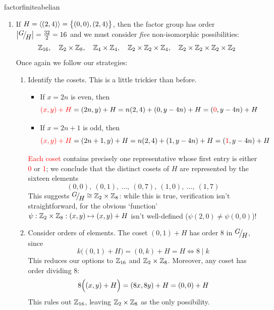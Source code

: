 \begin{examples}{}{factorfiniteabelian}
\begin{enumerate}
		\item\label{ex:factoriso3} If $H=\left\langle (2,4)\right\rangle=\bigl\{(0,0),(2,4)\bigr\}$, then the factor group has order $\nm{\quotient GH}=\frac{32}2=16$ and we must consider \emph{five} non-isomorphic possibilities:\footnotemark{}
		\[
			\mathbb{Z}_{16},\quad \mathbb{Z}_2\times\mathbb{Z}_8,\quad \mathbb{Z}_4\times\mathbb{Z}_4,\quad \mathbb{Z}_2\times\mathbb{Z}_2\times\mathbb{Z}_4,\quad \mathbb{Z}_2\times\mathbb{Z}_2\times\mathbb{Z}_2\times\mathbb{Z}_2
		\]
		Once again we follow our strategies:
		\begin{enumerate}
		  \item Identify the cosets. This is a little trickier than before.
		  \begin{itemize}
	  		\item If $x=2n$ is even, then
	  		\[
	  			\textcolor{red}{(x,y)+H}
	  			=(2n,y)+H
	  			=n(2,4)+(0,y-4n)+H
	  			=(\textcolor{red}{0},y-4n)+H
	  		\]
	  		\item If $x=2n+1$ is odd, then
	  		\[
	  			\textcolor{red}{(x,y)+H}
	  			=(2n+1,y)+H
	  			=n(2,4)+(1,y-4n)+H
	  			=(\textcolor{red}{1},y-4n)+H
	  		\]
	  	\end{itemize}
	 		\textcolor{red}{Each coset} contains precisely one representative whose first entry is either \textcolor{red}{0} or \textcolor{red}{1}; we conclude that the distinct cosets of $H$ are represented by the sixteen elements
			\[
				(0,0),\ (0,1),\ \ldots,\ (0,7),\ (1,0),\ \ldots,\ (1,7) \tag{$(x,y)$ where $x\in\Z_2$, $y\in\Z_8$}
			\]
			This suggests $\quotient GH\cong\Z_2\times\Z_8$: while this is true, verification isn't straightforward, for the obvious `function' $\psi:\mathbb{Z}_2\times\mathbb{Z}_8:(x,y)\mapsto(x,y)+H$ isn't well-defined ($\psi(2,0)\neq\psi(0,0)$)!
		  
			\item Consider orders of elements. The coset $(0,1)+H$ has order 8 in $\quotient GH$, since
			\[
				k\bigl((0,1)+H\bigr)=(0,k)+H=H\iff 8\mid k
			\]
			This reduces our options to $\mathbb{Z}_{16}$ and $\mathbb{Z}_2\times\mathbb{Z}_8$. Moreover, any coset has order dividing 8:
			\[
				8\Bigl((x,y)+H\Bigr)
				=(8x,8y)+H
				=(0,0)+H
			\]
	  	This rules out $\mathbb{Z}_{16}$, leaving $\mathbb{Z}_2\times\mathbb{Z}_8$ as the only possibility.
		\end{enumerate}
	\end{enumerate}
\end{examples}


		
